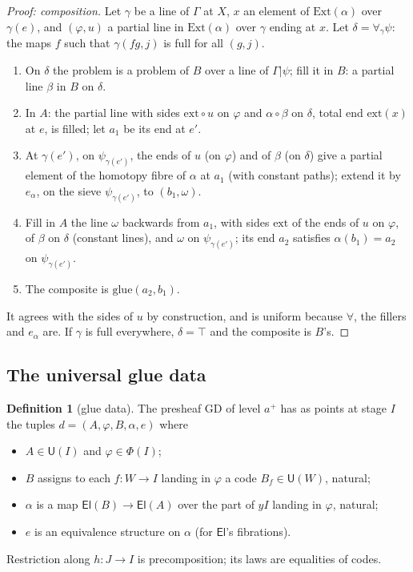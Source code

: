 \documentclass[11pt]{article}
\newcommand{\U}{\mathsf{U}}
\newcommand{\El}{\mathsf{El}}
\newcommand{\Ext}{\mathrm{Ext}}
\newcommand{\ext}{\mathrm{ext}}
\newcommand{\glue}{\mathrm{glue}}
\newcommand{\GD}{\mathrm{GD}}
\theoremstyle{plain}
\theoremstyle{definition}
\newtheorem{definition}[theorem]{Definition}
\theoremstyle{remark}
\begin{document}
\begin{proof}[Proof: composition]
Let $\gamma$ be a line of $\Gamma$ at $X$, $x$ an element of
$\Ext(\alpha)$ over $\gamma(e)$, and $(\varphi,u)$ a partial line in
$\Ext(\alpha)$ over $\gamma$ ending at $x$. Let $\delta=\forall_\gamma\psi$:
the maps $f$ such that $\gamma(fg,j)$ is full for all $(g,j)$.
\begin{enumerate}
\item On $\delta$ the problem is a problem of $B$ over a line of
  $\Gamma|\psi$; fill it in $B$: a partial line $\beta$ in $B$ on
  $\delta$.
\item In $A$: the partial line with sides $\ext\circ u$ on $\varphi$ and
  $\alpha\circ\beta$ on $\delta$, total end $\ext(x)$ at $e$, is filled;
  let $a_1$ be its end at $e'$.
\item At $\gamma(e')$, on $\psi_{\gamma(e')}$, the ends of $u$ (on
  $\varphi$) and of $\beta$ (on $\delta$) give a partial element of the
  homotopy fibre of $\alpha$ at $a_1$ (with constant paths); extend it by
  $e_\alpha$, on the sieve $\psi_{\gamma(e')}$, to $(b_1,\omega)$.
\item Fill in $A$ the line $\omega$ backwards from $a_1$, with sides
  $\ext$ of the ends of $u$ on $\varphi$, of $\beta$ on $\delta$ (constant
  lines), and $\omega$ on $\psi_{\gamma(e')}$; its end $a_2$ satisfies
  $\alpha(b_{1})=a_2$ on $\psi_{\gamma(e')}$.
\item The composite is $\glue(a_2,b_1)$.
\end{enumerate}
It agrees with the sides of $u$ by construction, and is uniform because
$\forall$, the fillers and $e_\alpha$ are. If $\gamma$ is full
everywhere, $\delta=\top$ and the composite is $B$'s.
\end{proof}

\subsection{The universal glue data}

\begin{definition}[glue data]
The presheaf $\GD$ of level $a^+$ has as points at stage $I$ the tuples
$d=(A,\varphi,B,\alpha,e)$ where
\begin{itemize}
\item $A\in\U(I)$ and $\varphi\in\Phi(I)$;
\item $B$ assigns to each $f:W\to I$ landing in $\varphi$ a code
  $B_f\in\U(W)$, natural;
\item $\alpha$ is a map $\El(B)\to\El(A)$ over the part of $yI$ landing in
  $\varphi$, natural;
\item $e$ is an equivalence structure on $\alpha$ (for $\El$'s
  fibrations).
\end{itemize}
Restriction along $h:J\to I$ is precomposition; its laws are equalities
of codes.
\end{definition}
\end{document}
